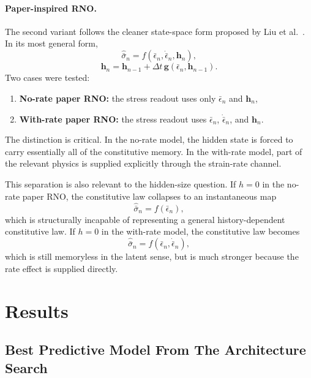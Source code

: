 \documentclass[11pt,a4paper]{article}
\newcommand{\epsbar}{\bar{\epsilon}}
\newcommand{\sigbar}{\bar{\sigma}}
\newcommand{\dt}{\Delta t}
\begin{document}
\paragraph{Paper-inspired RNO.}
The second variant follows the cleaner state-space form proposed by Liu et al.~\cite{Liu_2023}. In its most general form,
\begin{equation}
\hat{\sigbar}_n=f\!\left(\epsbar_n,\dot{\epsbar}_n,\bm{h}_{n}\right),
\label{eq:paper_stress_relation}
\end{equation}
\begin{equation}
\bm{h}_{n}=\bm{h}_{n-1}+\dt\,\bm{g}\!\left(\epsbar_n,\bm{h}_{n-1}\right).
\label{eq:paper_kinetic_relation}
\end{equation}
Two cases were tested:
\begin{enumerate}[leftmargin=1.5em]
    \item \textbf{No-rate paper RNO:} the stress readout uses only $\epsbar_n$ and $\bm{h}_n$,
    \item \textbf{With-rate paper RNO:} the stress readout uses $\epsbar_n$, $\dot{\epsbar}_n$, and $\bm{h}_n$.
\end{enumerate}
The distinction is critical. In the no-rate model, the hidden state is forced to carry essentially all of the constitutive memory. In the with-rate model, part of the relevant physics is supplied explicitly through the strain-rate channel.

This separation is also relevant to the hidden-size question. If $h=0$ in the no-rate paper RNO, the constitutive law collapses to an instantaneous map
\begin{equation}
\hat{\sigbar}_n=f\!\left(\epsbar_n\right),
\label{eq:h0_no_rate}
\end{equation}
which is structurally incapable of representing a general history-dependent constitutive law. If $h=0$ in the with-rate model, the constitutive law becomes
\begin{equation}
\hat{\sigbar}_n=f\!\left(\epsbar_n,\dot{\epsbar}_n\right),
\label{eq:h0_with_rate}
\end{equation}
which is still memoryless in the latent sense, but is much stronger because the rate effect is supplied directly.

\FloatBarrier
\section{Results}

\subsection{Best Predictive Model From The Architecture Search}
\end{document}
